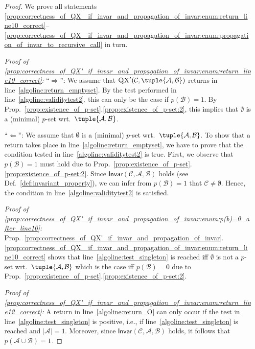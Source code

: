 \documentclass[]{elsarticle}
\newcommand{\scQX}{{\textsc{QX}}}
\newcommand{\ma}{\mathcal{A}}
\newcommand{\mb}{\mathcal{B}}
\newcommand{\mc}{\mathcal{C}}
\newcommand{\Inv}{\mathsf{Invar}}
\begin{document}
	\begin{proof} We prove all statements \ref{prop:correctness_of_QX'_if_invar_and_propagation_of_invar:enum:return_line10_correct}--\ref{prop:correctness_of_QX'_if_invar_and_propagation_of_invar:enum:propagation_of_invar_to_recursive_call} in turn.\vspace{5pt}
		
		\noindent\emph{Proof of \ref{prop:correctness_of_QX'_if_invar_and_propagation_of_invar:enum:return_line10_correct}:} 
		``$\Rightarrow$'': We assume that $\scQX'(\mc,\tuple{\ma,\mb})$ returns in line~\ref{algoline:return_emptyset}. By the test performed in line~\ref{algoline:validitytest2}, 
		this can only be the case if $p(\mb)=1$. By Prop.~\ref{prop:existence_of_p-set}.\ref{prop:existence_of_p-set:2}, this implies that $\emptyset$ is a (minimal) $p$-set wrt.\ $\tuple{\ma,\mb}$.
		
		\noindent ``$\Leftarrow$'': We assume that $\emptyset$ is a (minimal) $p$-set wrt.\ $\tuple{\ma,\mb}$. To show that a return takes place in line~\ref{algoline:return_emptyset}, we have to prove that the condition tested in line~\ref{algoline:validitytest2} is true. First, we observe that $p(\mb)=1$ must hold due to Prop.~\ref{prop:existence_of_p-set}.\ref{prop:existence_of_p-set:2}. Since $\Inv(\mc,\ma,\mb)$ holds (see Def.~\ref{def:invariant_property}), we can infer from $p(\mb)=1$ that $\mc\neq \emptyset$. Hence, the condition in line~\ref{algoline:validitytest2} is satisfied. \vspace{5pt}
		
		\noindent\emph{Proof of \ref{prop:correctness_of_QX'_if_invar_and_propagation_of_invar:enum:p(b)=0_after_line10}:} 
		Prop.~\ref{prop:correctness_of_QX'_if_invar_and_propagation_of_invar}.\ref{prop:correctness_of_QX'_if_invar_and_propagation_of_invar:enum:return_line10_correct}
		shows that line~\ref{algoline:test_singleton} is reached iff $\emptyset$ is not a $p$-set wrt.\ $\tuple{\ma,\mb}$ which is the case iff $p(\mb)=0$ due to Prop.~\ref{prop:existence_of_p-set}.\ref{prop:existence_of_p-set:2}.\vspace{5pt}
		
		\noindent\emph{Proof of \ref{prop:correctness_of_QX'_if_invar_and_propagation_of_invar:enum:return_line12_correct}:} 
		A return in line~\ref{algoline:return_O} can only occur if the test in line~\ref{algoline:test_singleton} is positive, i.e., if line~\ref{algoline:test_singleton} is reached and $|\ma|=1$. Moreover, since $\Inv(\mc,\ma,\mb)$ holds, it follows that $p(\ma\cup\mb)=1$. 
		

\end{proof}
\end{document}
